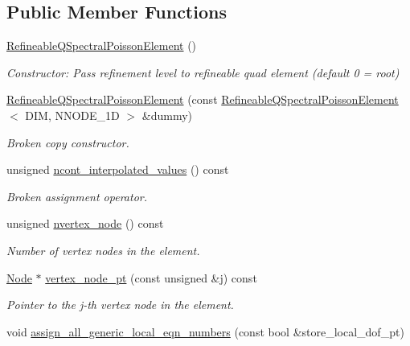 \subsection*{Public Member Functions}
\begin{DoxyCompactItemize}
\item 
\hyperlink{classoomph_1_1RefineableQSpectralPoissonElement_a861d8b8c338f6719a2adea84d24eb9a8}{Refineable\+Q\+Spectral\+Poisson\+Element} ()
\begin{DoxyCompactList}\small\item\em Constructor\+: Pass refinement level to refineable quad element (default 0 = root) \end{DoxyCompactList}\item 
\hyperlink{classoomph_1_1RefineableQSpectralPoissonElement_a82b24be285a5709ecfb0f9bbbc0e1bed}{Refineable\+Q\+Spectral\+Poisson\+Element} (const \hyperlink{classoomph_1_1RefineableQSpectralPoissonElement}{Refineable\+Q\+Spectral\+Poisson\+Element}$<$ D\+IM, N\+N\+O\+D\+E\+\_\+1D $>$ \&dummy)
\begin{DoxyCompactList}\small\item\em Broken copy constructor. \end{DoxyCompactList}\item 
unsigned \hyperlink{classoomph_1_1RefineableQSpectralPoissonElement_a26af03886ceaba5e55d76e03c06446cf}{ncont\+\_\+interpolated\+\_\+values} () const
\begin{DoxyCompactList}\small\item\em Broken assignment operator. \end{DoxyCompactList}\item 
unsigned \hyperlink{classoomph_1_1RefineableQSpectralPoissonElement_a10859fa076e489db05d21b30599edda9}{nvertex\+\_\+node} () const
\begin{DoxyCompactList}\small\item\em Number of vertex nodes in the element. \end{DoxyCompactList}\item 
\hyperlink{classoomph_1_1Node}{Node} $\ast$ \hyperlink{classoomph_1_1RefineableQSpectralPoissonElement_a42f1a9b5e69470d825f814e047526287}{vertex\+\_\+node\+\_\+pt} (const unsigned \&j) const
\begin{DoxyCompactList}\small\item\em Pointer to the j-\/th vertex node in the element. \end{DoxyCompactList}\item 
void \hyperlink{classoomph_1_1RefineableQSpectralPoissonElement_ac6e937b985ab8af65695dd502f48ab43}{assign\+\_\+all\+\_\+generic\+\_\+local\+\_\+eqn\+\_\+numbers} (const bool \&store\+\_\+local\+\_\+dof\+\_\+pt)

\end{DoxyCompactItemize}
